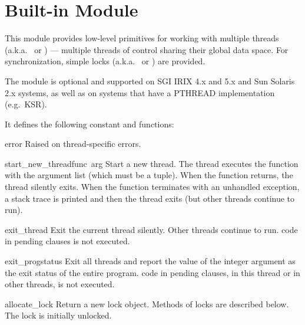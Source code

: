 \section{Built-in Module }

This module provides low-level primitives for working with multiple
threads (a.k.a.\  or ) --- multiple
threads of control sharing their global data space.  For
synchronization, simple locks (a.k.a.\  or ) are provided.

The module is optional and supported on SGI IRIX 4.x and 5.x and Sun
Solaris 2.x systems, as well as on systems that have a PTHREAD
implementation (e.g.\ KSR).

It defines the following constant and functions:

\renewcommand{\indexsubitem}{(in module thread)}
\begin{excdesc}{error}
Raised on thread-specific errors.
\end{excdesc}

\begin{funcdesc}{start_new_thread}{func\, arg}
Start a new thread.  The thread executes the function 
with the argument list  (which must be a tuple).  When the
function returns, the thread silently exits.  When the function
terminates with an unhandled exception, a stack trace is printed and
then the thread exits (but other threads continue to run).
\end{funcdesc}

\begin{funcdesc}{exit_thread}{}
Exit the current thread silently.  Other threads continue to run.
 code in pending  clauses is not executed.
\end{funcdesc}

\begin{funcdesc}{exit_prog}{status}
Exit all threads and report the value of the integer argument
 as the exit status of the entire program.
 code in pending  clauses, in this thread
or in other threads, is not executed.
\end{funcdesc}

\begin{funcdesc}{allocate_lock}{}
Return a new lock object.  Methods of locks are described below.  The
lock is initially unlocked.
\end{funcdesc}

